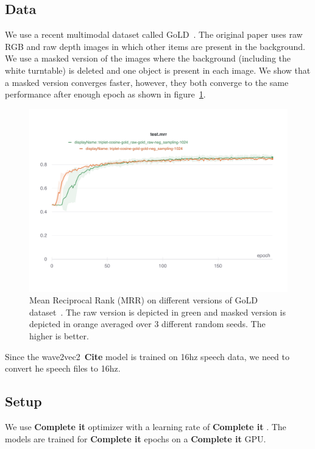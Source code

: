 \documentclass[11pt]{article}
\newcommand{\CitationNeeded}[1]{{\textbf {\color{red}Cite #1}}}
\newcommand{\Complete}[0]{{\textbf {\color{red}Complete it }}}
\begin{document}
\subsection{Data}
\label{sec:Data}

We use a recent multimodal dataset called GoLD~\cite{GoLD_UMBC}. The original paper uses raw RGB and raw depth images in which other items are present in the background. We use a masked version of the images where the background (including the white turntable) is deleted and one object is present in each image.
We show that a masked version converges faster, however, they both converge to the same performance after enough epoch as shown  in figure~\ref{fig:mask-vs-raw}.

\begin{figure}[tbh]
\centering
\includegraphics[width=2.0\columnwidth]{Figures/raw-mask-test-mrr.pdf}
\caption{Mean Reciprocal Rank (MRR) on different versions of GoLD dataset~\cite{GoLD_UMBC}. The raw version is depicted in green and masked version is depicted in orange averaged over 3 different random seeds. The higher is better.}
\label{fig:mask-vs-raw}
\end{figure}


Since the wave2vec2~\CitationNeeded{} model is trained on 16hz speech data, we need to convert he speech files to 16hz.



\subsection{Setup}
\label{sec:setup}

We use \Complete optimizer with a learning rate of \Complete.
The models are trained for \Complete epochs on a \Complete GPU.
\end{document}
